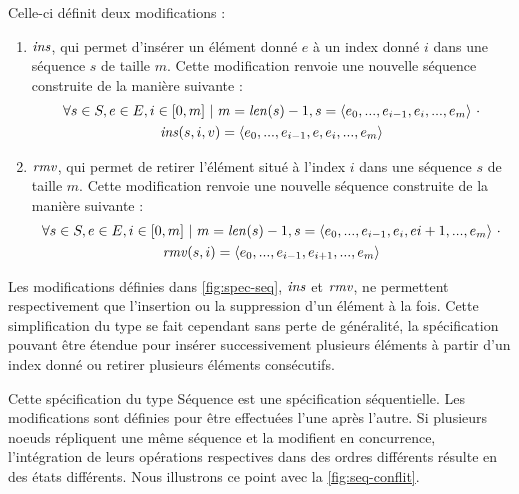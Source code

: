 Celle-ci définit deux modifications :
\begin{enumerate}
  \item $\mathit{ins}$, qui permet d'insérer un élément donné $e$ à un index donné $i$ dans une séquence $s$ de taille $m$.
    Cette modification renvoie une nouvelle séquence construite de la manière suivante :
    \begin{multline*}
      \forall s \in S, e \in E, i \in [0,m]~|~m = \mathit{len}(s) - 1,
      s = \langle e_0, ..., e_{i-1}, e_{i}, ..., e_m \rangle~\cdot \\
      \mathit{ins}(s,i,v) = \langle e_0, ..., e_{i-1}, e, e_{i}, ..., e_m  \rangle
    \end{multline*}
  \item $\mathit{rmv}$, qui permet de retirer l'élément situé à l'index $i$ dans une séquence $s$ de taille $m$.
    Cette modification renvoie une nouvelle séquence construite de la manière suivante :
    \begin{multline*}
      \forall s \in S, e \in E, i \in [0,m]~|~m = \mathit{len}(s) - 1,
      s = \langle e_0, ..., e_{i-1}, e_{i}, e{i+1}, ..., e_m \rangle~\cdot \\
      \mathit{rmv}(s,i) = \langle e_0, ..., e_{i-1}, e_{i+1}, ..., e_m  \rangle
    \end{multline*}
\end{enumerate}
Les modifications définies dans \autoref{fig:spec-seq}, $\mathit{ins}$ et $\mathit{rmv}$, ne permettent respectivement que l'insertion ou la suppression d'un élément à la fois.
Cette simplification du type se fait cependant sans perte de généralité, la spécification pouvant être étendue pour insérer successivement plusieurs éléments à partir d'un index donné ou retirer plusieurs éléments consécutifs.

Cette spécification du type Séquence est une spécification séquentielle.
Les modifications sont définies pour être effectuées l'une après l'autre.
Si plusieurs noeuds répliquent une même séquence et la modifient en concurrence, l'intégration de leurs opérations respectives dans des ordres différents résulte en des états différents.
Nous illustrons ce point avec la \autoref{fig:seq-conflit}.

